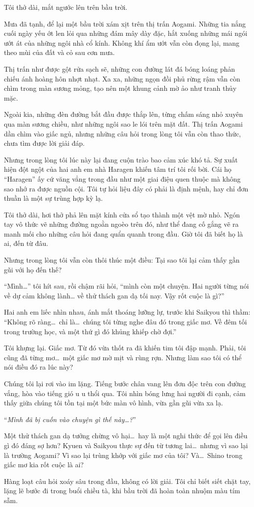 \documentclass[../main.tex]{subfiles}
\begin{document}
Tôi thở dài, mắt ngước lên trên bầu trời.

Mưa đã tạnh, để lại một bầu trời xám xịt trên thị trấn Aogami. Những tia nắng cuối ngày yếu ớt len lỏi qua những đám mây dày đặc, hắt xuống những mái ngói ướt át của những ngôi nhà cổ kính. Không khí ẩm ướt vẫn còn đọng lại, mang theo mùi của đất và cỏ sau cơn mưa.

Thị trấn như được gột rửa sạch sẽ, những con đường lát đá bóng loáng phản chiếu ánh hoàng hôn nhợt nhạt. Xa xa, những ngọn đồi phủ rừng rậm vẫn còn chìm trong màn sương mỏng, tạo nên một khung cảnh mờ ảo như tranh thủy mặc.

Ngoài kia, những đèn đường bắt đầu được thắp lên, từng chấm sáng nhỏ xuyên qua màn sương chiều, như những ngôi sao le lói trên mặt đất. Thị trấn Aogami dần chìm vào giấc ngủ, nhưng những câu hỏi trong lòng tôi vẫn còn thao thức, chưa tìm được lời giải đáp.

Nhưng trong lòng tôi lúc này lại đang cuộn trào bao cảm xúc khó tả. Sự xuất hiện đột ngột của hai anh em nhà Haragen khiến tâm trí tôi rối bời. Cái họ ``Haragen'' ấy cứ văng vẳng trong đầu như một giai điệu quen thuộc mà không sao nhớ ra được nguồn cội. Tôi tự hỏi liệu đây có phải là định mệnh, hay chỉ đơn thuần là một sự trùng hợp kỳ lạ.

Tôi thở dài, hơi thở phả lên mặt kính cửa sổ tạo thành một vệt mờ nhỏ. Ngón tay vô thức vẽ những đường ngoằn ngoèo trên đó, như thể đang cố gắng vẽ ra manh mối cho những câu hỏi đang quẩn quanh trong đầu. Giờ tôi đã biết họ là ai, đến từ đâu.

Nhưng trong lòng tôi vẫn còn thôi thúc một điều: Tại sao tôi lại cảm thấy gần gũi với họ đến thế?

``Mình\dots'' tôi hít sau, rồi chậm rãi hỏi, ``mình còn một chuyện. Hai người từng nói về dự cảm không lành… về thử thách gan dạ tối nay. Vậy rốt cuộc là gì?''

Hai anh em liếc nhìn nhau, ánh mắt thoáng lưỡng lự, trước khi Saikyou thì thầm: ``Không rõ ràng\dots\ chỉ là\dots\ chúng tôi từng nghe đâu đó trong giấc mơ. Về đêm tối trong trường học, và một thứ gì đó khủng khiếp chờ đợi.''

Tôi khựng lại. Giấc mơ. Từ đó vừa thốt ra đã khiến tim tôi đập mạnh. Phải, tôi cũng đã từng mơ\dots\ một giấc mơ mờ mịt và rùng rợn. Nhưng làm sao tôi có thể nói điều đó ra lúc này?

Chúng tôi lại rơi vào im lặng. Tiếng bước chân vang lên đơn độc trên con đường vắng, hòa vào tiếng gió u u thổi qua. Tôi nhìn bóng lưng hai người đi cạnh, cảm thấy giữa chúng tôi tồn tại một bức màn vô hình, vừa gần gũi vừa xa lạ.

``\textit{Mình đã bị cuốn vào chuyện gì thế này\dots?}''

Một thử thách gan dạ tưởng chừng vô hại\dots\ hay là một nghi thức để gọi lên điều gì đó đáng sợ hơn? Kyuen và Saikyou thực sự đến từ tương lai\dots\ nhưng vì sao lại là trường Aogami? Vì sao lại trùng khớp với giấc mơ của tôi? Và\dots\ Shino trong giấc mơ kia rốt cuộc là ai?

Hàng loạt câu hỏi xoáy sâu trong đầu, không có lời giải. Tôi chỉ biết siết chặt tay, lặng lẽ bước đi trong buổi chiều tà, khi bầu trời đã hoàn toàn nhuộm màu tím sẫm.
\end{document}
